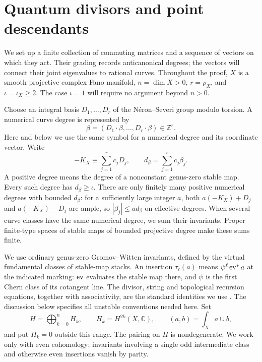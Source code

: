 \section{Quantum divisors and point descendants}\label{sec:setup}

We set up a finite collection of commuting matrices and a sequence of
vectors on which they act. Their grading records anticanonical degrees;
the vectors will connect their joint eigenvalues to rational curves.
Throughout the proof, $X$ is a smooth projective complex Fano manifold,
$n=\dim X>0$, $r=\rho_X$, and $\iota=\iota_X\ge2$.
The case $\iota=1$ will require no argument beyond $n>0$.

Choose an integral basis $D_1,\ldots,D_r$ of the N\'eron--Severi group
modulo torsion. A numerical curve degree is represented by
\[
 \beta=(D_1\cdot\beta,\ldots,D_r\cdot\beta)\in\mathbb Z^r.
\]
Here and below we use the same symbol for a numerical degree and its
coordinate vector. Write
\[
 -K_X\equiv\sum_{j=1}^r c_jD_j,
 \qquad d_\beta=\sum_{j=1}^r c_j\beta_j.
\]
A positive degree means the degree of a nonconstant genus-zero stable
map. Every such degree has $d_\beta\ge\iota$. There are only finitely
many positive numerical degrees with bounded $d_\beta$: for a
sufficiently large integer $a$, both $a(-K_X)+D_j$ and $a(-K_X)-D_j$
are ample, so $|\beta_j|\le a d_\beta$ on effective degrees.
When several curve classes have the same numerical degree, we sum their
invariants. Proper finite-type spaces of stable maps of bounded
projective degree make these sums finite.

We use ordinary genus-zero Gromov--Witten invariants, defined by the
virtual fundamental classes of stable-map stacks. An insertion
$\tau_\ell(a)$ means $\psi^\ell\operatorname{ev}^*a$ at the indicated marking:
$\operatorname{ev}$ evaluates the stable map there, and $\psi$ is the first Chern
class of its cotangent line.
The divisor, string and topological recursion equations, together with
associativity, are the standard identities we use
\cite{BehrendVirtual,KontsevichManinQuantum,KontsevichManinDescendants,PandharipandeDescendants}.
The discussion below specifies all unstable conventions needed here.
Set
\[
 H=\bigoplus_{k=0}^n H_k,
 \qquad H_k=H^{2k}(X,\mathbb C),
 \qquad (a,b)=\int_Xa\cup b,
\]
and put $H_k=0$ outside this range. The pairing on $H$ is nondegenerate.
We work only with even cohomology; invariants involving a single odd
intermediate class and otherwise even insertions vanish by parity.

